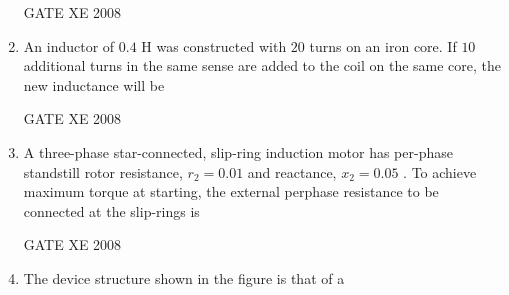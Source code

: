 \documentclass[12pt]{article}
\begin{document}
\begin{enumerate}
GATE XE 2008
\item An inductor of $0.4$ H was constructed with $20$ turns on an iron core. If $10$ additional turns in the same sense are added to the coil on the same core, the new inductance will be

\begin{enumerate}
\end{enumerate}

GATE XE 2008
\item  A three-phase star-connected, slip-ring induction motor has per-phase standstill rotor resistance, $r_{2} = 0.01$ and reactance, $x_{2} = 0.05$ . To achieve maximum torque at starting, the external perphase resistance to be connected at the slip-rings is

\begin{enumerate}
\end{enumerate}

GATE XE 2008
\item  The device structure shown in the figure is that of a


\end{enumerate}
\end{document}
